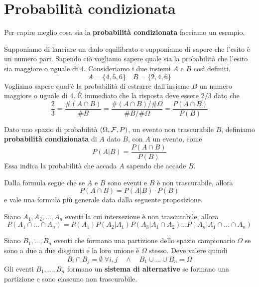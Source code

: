 \chapter{Probabilità condizionata}
Per capire meglio cosa sia la \textbf{probabilità condizionata} facciamo un esempio.

\begin{example}
	Supponiamo di lanciare un dado equilibrato e supponiamo di sapere che l'esito è un numero
	pari. Sapendo ciò vogliamo sapere quale sia la probabilità che l'esito sia maggiore o uguale
	di 4. Consideriamo i due insiemi $A$ e $B$ così definiti. 
	\[ A = \{ 4, 5, 6 \} \quad B = \{ 2, 4, 6 \} \]
	Vogliamo sapere qual'è la probabilità di estrarre dall'insieme $B$ un numero maggiore o uguale
	di 4. \`E immediato che la risposta deve essere $2/3$ dato che 
	\[
		\frac{2}{3} = \frac{\# (A \cap B)}{\# B} =
		\frac{\# (A \cap B) / \# \Omega}{\# B / \# \Omega} =
		\frac{P(A \cap B)}{P(B)}
	\]
\end{example}

\begin{definition}
	Dato uno spazio di probabilità $(\Omega, \mathcal{F}, P)$, un evento non trascurabile $B$, definiamo 
	\textbf{probabilità condizionata} di $A$ dato $B$, con $A$ un evento, come 
	\[ P(A | B) = \frac{P(A \cap B)}{P(B)} \]
	Essa indica la probabilità che accada $A$ sapendo che accade $B$.
\end{definition}

Dalla formula segue che se $A$ e $B$ sono eventi e $B$ è non trascurabile, allora 
\[ P(A \cap B) = P(A | B) \cdot P(B) \]
e vale una formula più generale data dalla seguente proposizione.

\begin{proposition}
	Siano $A_1, A_2, ..., A_n$ eventi la cui intersezione è non trascurabile, allora
	\[
		P(A_1 \cap  ... \cap A_n) = P(A_1) P(A_2 | A_1) P(A_3 | A_1 \cap A_2)
		... P(A_n | A_1 \cap ... \cap A_n)
	\]
\end{proposition}

\begin{definition}
	Siano $B_1, ..., B_n$ eventi che formano una partizione dello spazio campionario $\Omega$ se
	sono a due a due disgiunti e la loro unione è $\Omega$ stesso. Deve valere quindi 
	\[ B_i \cap B_j = \emptyset \; \forall i,j \quad \land \quad B_1 \cup ... \cup B_n = \Omega \]
	Gli eventi $B_1, ..., B_n$ formano un \textbf{sistema di alternative} se formano una 
	partizione e sono ciascuno non trascurabile.
\end{definition}

